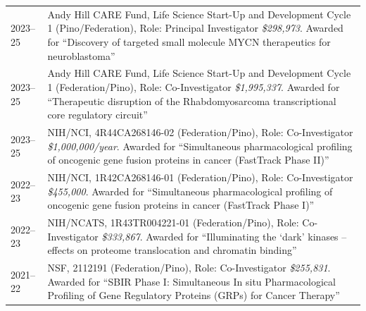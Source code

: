 \documentclass[11pt]{article}
\begin{document}
\begin{tabular}{V}
  2023--25 & {Andy Hill CARE Fund, Life Science Start-Up and Development Cycle 1 
  (Pino/Federation), Role: Principal Investigator}
             \newline \textit{\$298,973}. Awarded for ``Discovery of targeted small 
             molecule MYCN therapeutics for neuroblastoma'' \\
  2023--25 & {Andy Hill CARE Fund, Life Science Start-Up and Development Cycle 1 
  (Federation/Pino), Role: Co-Investigator}
             \newline \textit{\$1,995,337}. Awarded for ``Therapeutic disruption of the 
             Rhabdomyosarcoma transcriptional core regulatory circuit'' \\
  2023--25 & {NIH/NCI, 4R44CA268146-02 (Federation/Pino), Role: Co-Investigator}
             \newline \textit{\$1,000,000/year}. Awarded for ``Simultaneous pharmacological 
             profiling of oncogenic gene fusion proteins in cancer (FastTrack Phase II)'' \\
  2022--23 & {NIH/NCI, 1R42CA268146-01 (Federation/Pino), Role: Co-Investigator}
             \newline \textit{\$455,000}. Awarded for ``Simultaneous pharmacological 
             profiling of oncogenic gene fusion proteins in cancer (FastTrack Phase I)'' \\
  2022--23 & {NIH/NCATS, 1R43TR004221-01 (Federation/Pino), Role: Co-Investigator}
             \newline \textit{\$333,867}. Awarded for ``Illuminating the `dark' kinases -- effects 
             on proteome translocation and chromatin binding'' \\
  2021--22 & {NSF, 2112191 (Federation/Pino), Role: Co-Investigator}
             \newline \textit{\$255,831}. Awarded for ``SBIR Phase I: Simultaneous In situ 
             Pharmacological Profiling of Gene Regulatory Proteins (GRPs) for Cancer Therapy'' \\


\end{tabular}


\pubcount
\end{document}
